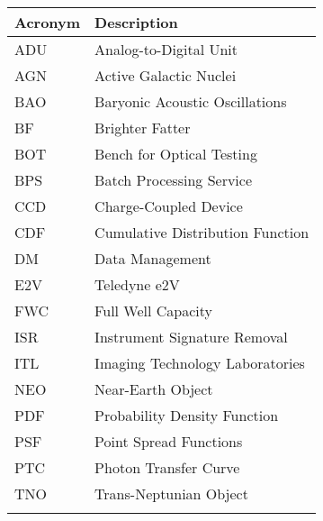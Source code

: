 \addtocounter{table}{-1}
\begin{longtable}{p{}p{}}\hline
\textbf{Acronym} & \textbf{Description}  \\\hline
ADU & Analog-to-Digital Unit    \\
AGN & Active Galactic Nuclei    \\
BAO & Baryonic Acoustic Oscillations    \\
BF & Brighter Fatter    \\
BOT & Bench for Optical Testing    \\
BPS & Batch Processing Service    \\
CCD & Charge-Coupled Device    \\
CDF & Cumulative Distribution Function    \\
DM & Data Management    \\
E2V & Teledyne e2V    \\
FWC & Full Well Capacity    \\
ISR & Instrument Signature Removal    \\
ITL & Imaging Technology Laboratories    \\
NEO & Near-Earth Object    \\
PDF & Probability Density Function    \\
PSF & Point Spread Functions    \\
PTC & Photon Transfer Curve    \\
TNO & Trans-Neptunian Object    \\
\\\hline
\end{longtable}
